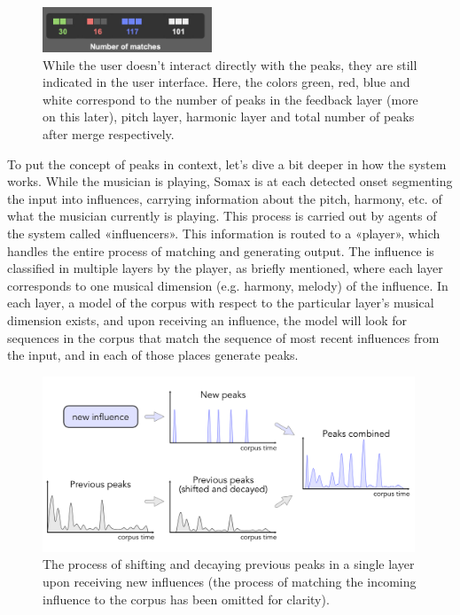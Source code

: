  \begin{figure}[h!]
    \centering        
 	\includegraphics[width=0.45\textwidth]{img/peaks_ui.png}
    \caption{While the user doesn't interact directly with the peaks, they are still indicated in the user interface.    Here, the colors green, red, blue and white correspond to the number of peaks in the feedback layer (more on this later), pitch layer, harmonic layer and total number of peaks after merge respectively.}
\end{figure}

To put the concept of peaks in context, let's dive a bit deeper in how the system works. While the musician is playing, Somax is at each detected onset segmenting the input into influences, carrying information about the pitch, harmony, etc. of what the musician currently is playing. This process is carried out by agents of the system called «influencers». This information is routed to a «player», which handles the entire process of matching and generating output. The influence is classified in multiple layers by the player, as briefly mentioned, where each layer corresponds to one musical dimension (e.g. harmony, melody) of the influence. In each layer, a model of the corpus with respect to the particular layer's musical dimension exists, and upon receiving an influence, the model will look for sequences in the corpus that match the sequence of most recent influences from the input, and in each of those places generate peaks. 

 \begin{figure}[h]
    \centering        
 	\includegraphics[width=0.99\textwidth]{img/peaks_decay.png}
    \caption{The process of shifting and decaying previous peaks in a single layer upon receiving new influences (the process of matching the incoming influence to the corpus has been omitted for clarity).}
    \label{fig:peakdecay}
\end{figure}

